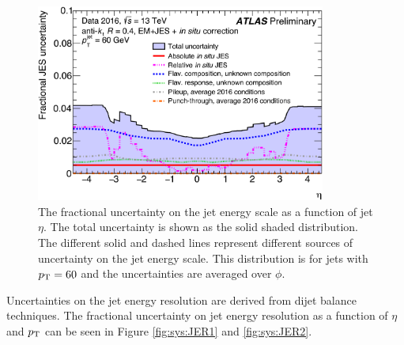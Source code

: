 \begin{figure}[!h]
\begin{center}
\includegraphics[width=0.85\textwidth]{figures/JetCalib/JES_eta.png}
\caption[The fractional uncertainty on the jet energy scale vs jet $\eta$. ]{The fractional uncertainty on the jet energy scale as a function of jet $\eta$.  The total uncertainty is shown as the solid shaded distribution.  The different solid and dashed lines represent different sources of uncertainty on the jet energy scale. This distribution is for jets with $p_{\mathrm{T}} = 60$ \gev and the uncertainties are averaged over $\phi$.}
\label{fig:sys:JES2}
\end{center}
\end{figure}

\indent Uncertainties on the jet energy resolution are derived from dijet balance techniques.\cite{JES_dijet}  The fractional uncertainty on jet energy resolution as a function of $\eta$ and $p_{\mathrm{T}}$ can be seen in Figure \ref{fig:sys:JER1} and \ref{fig:sys:JER2}. \\

